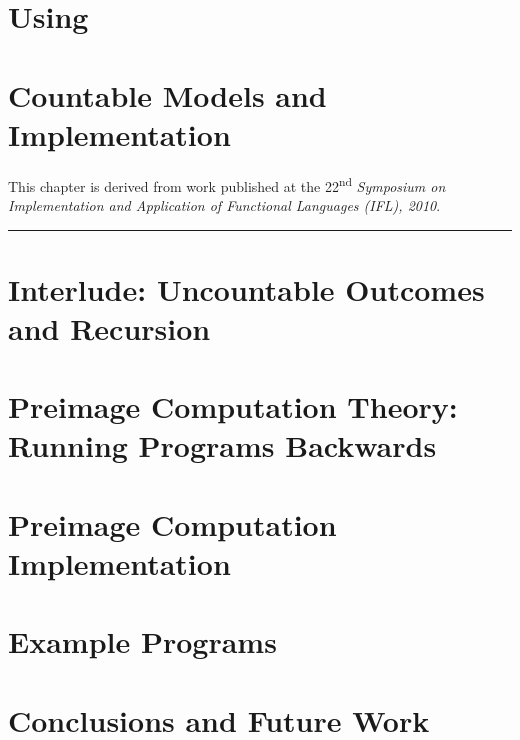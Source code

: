 \documentclass[phd,letterpaper,lof,chaptercenter,parttop,electronic]{byumsphd}
\begin{document}



\chapter{Using \lzfclang}
\label{ch:using-lambda-zfc}




\chapter{Countable Models and Implementation}
\label{ch:countable-models}

This chapter is derived from work published at the 22\textsuperscript{nd} \emph{Symposium on Implementation and Application of Functional Languages (IFL), 2010}.

\vspace{\baselineskip}
\hrule
\vspace{\baselineskip}



\chapter{Interlude: Uncountable Outcomes and Recursion}
\label{ch:interlude}




\chapter{Preimage Computation Theory: Running Programs Backwards}
\label{ch:preimage1}




\chapter{Preimage Computation Implementation}
\label{ch:preimage2}




\chapter{Example Programs}
\label{ch:examples}




\chapter{Conclusions and Future Work}
\end{document}
